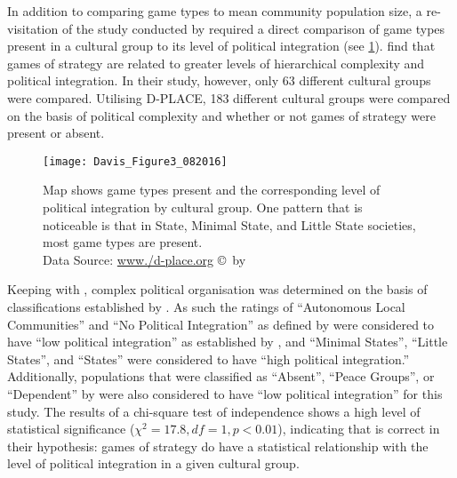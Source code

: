 In addition to comparing game types to mean community population size, a re-visitation of the study conducted by  \textcite{roberts1959} required a direct comparison of game types present in a cultural group to its level of political integration (see \cref{fig:Figure3_Davis_082016}).  \textcite{roberts1959} find that games of strategy are related to greater levels of hierarchical complexity and political integration. In their study, however, only 63 different cultural groups were compared. Utilising D-PLACE, 183 different cultural groups were compared on the basis of political complexity and whether or not games of strategy were present or absent.

\begin{figure} [!htb] %
	\texttt{[image: Davis\_Figure3\_082016]}
	\caption{Map shows game types present and the corresponding level of political integration by cultural group. One pattern that is noticeable is that in State, Minimal State, and Little State societies, most game types are present.
	{\normalfont\scriptsize \\ Data Source: \href{http:/www./d-place.org}{www./d-place.org} \copyright\ by 
                 \shortauthor
                  }}
	\label{fig:Figure3_Davis_082016}
\end{figure}

Keeping with \textcite{roberts1959}, complex political organisation was determined on the basis of classifications established by \textcite{murdock1957}. As such the ratings of ``Autonomous Local Communities” and ``No Political Integration” as defined by \textcite{murdock1957} were considered to have ``low political integration” as established by \textcite{roberts1959}, and ``Minimal States”, ``Little States”, and ``States” were considered to have ``high political integration.” Additionally, populations that were classified as ``Absent”, ``Peace Groups”, or ``Dependent” by \textcite{murdock1957} were also considered to have ``low political integration” for this study. The results of a chi-square test of independence shows a high level of statistical significance ($\chi^{2} = 17.8, df = 1, p < 0.01$), indicating that \textcite{roberts1959} is correct in their hypothesis: games of strategy do have a statistical relationship with the level of political integration in a given cultural group.

